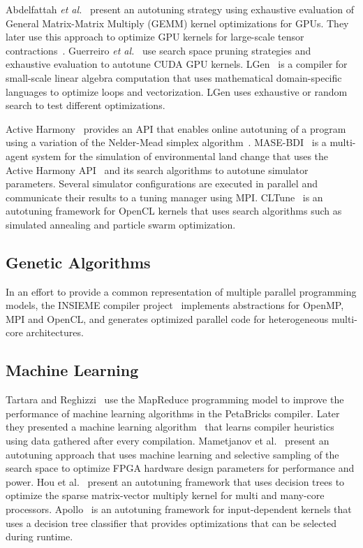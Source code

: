 Abdelfattah \emph{et al.}~\cite{abdelfattah2016performance} present an autotuning
strategy using exhaustive evaluation of General Matrix-Matrix Multiply (GEMM)
kernel optimizations for GPUs. They later use this approach to optimize GPU
kernels for large-scale tensor contractions~\cite{abdelfattah2016high}.
Guerreiro \emph{et al.}~\cite{guerreiro2015multi} use search space pruning strategies
and exhaustive evaluation to autotune CUDA GPU kernels.
LGen~\cite{spampinato2014basic} is a compiler for small-scale linear algebra
computation that uses mathematical domain-specific languages to optimize loops
and vectorization. LGen uses exhaustive or random search to test different
optimizations.

Active Harmony~\cite{tapus2002active} provides an API that enables online
autotuning of a program using a variation of the Nelder-Mead simplex
algorithm~\cite{nelder1965simplex}.  MASE-BDI~\cite{coelho2016mase} is a
multi-agent system for the simulation of environmental land change that uses
the Active Harmony API~\cite{tapus2002active} and its search algorithms to
autotune  simulator parameters.  Several simulator configurations are executed
in parallel and communicate their results to a tuning manager using MPI.
CLTune~\cite{nugteren2015cltune} is an autotuning framework for OpenCL kernels
that uses search algorithms such as simulated annealing and particle swarm
optimization.

\subsection{Genetic Algorithms}

In an effort to provide a common representation of multiple parallel
programming models, the INSIEME compiler project~\cite{jordan2012multi}
implements abstractions for OpenMP, MPI and OpenCL, and generates optimized
parallel code for heterogeneous multi-core architectures.

\subsection{Machine Learning}

Tartara and Reghizzi~\cite{tartara2012parallel} use the MapReduce programming
model to improve the performance of machine learning algorithms in the
PetaBricks compiler. Later they presented a machine learning
algorithm~\cite{tartara2013continuous} that learns compiler heuristics using
data gathered after every compilation.  Mametjanov et
al.~\cite{mametjanov2015autotuning} present an autotuning approach that uses
machine learning and selective sampling of the search space to optimize FPGA
hardware design parameters for performance and power.  Hou et
al.~\cite{hou2017auto} present an autotuning framework that uses decision trees
to optimize the sparse matrix-vector multiply kernel for multi and many-core
processors.  Apollo~\cite{beckingsale2017apollo} is an autotuning framework for
input-dependent kernels that uses a decision tree classifier that provides
optimizations that can be selected during runtime.

